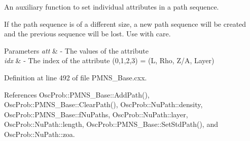 An auxiliary function to set individual attributes in a path sequence.

If the path sequence is of a different size, a new path sequence will be created and the previous sequence will be lost. Use with care.


\begin{DoxyParams}{Parameters}
{\em att} & -\/ The values of the attribute \\
\hline
{\em idx} & -\/ The index of the attribute (0,1,2,3) = (L, Rho, Z/A, Layer) \\
\hline
\end{DoxyParams}


Definition at line 492 of file P\+M\+N\+S\+\_\+\+Base.\+cxx.



References Osc\+Prob\+::\+P\+M\+N\+S\+\_\+\+Base\+::\+Add\+Path(), Osc\+Prob\+::\+P\+M\+N\+S\+\_\+\+Base\+::\+Clear\+Path(), Osc\+Prob\+::\+Nu\+Path\+::density, Osc\+Prob\+::\+P\+M\+N\+S\+\_\+\+Base\+::f\+Nu\+Paths, Osc\+Prob\+::\+Nu\+Path\+::layer, Osc\+Prob\+::\+Nu\+Path\+::length, Osc\+Prob\+::\+P\+M\+N\+S\+\_\+\+Base\+::\+Set\+Std\+Path(), and Osc\+Prob\+::\+Nu\+Path\+::zoa.


